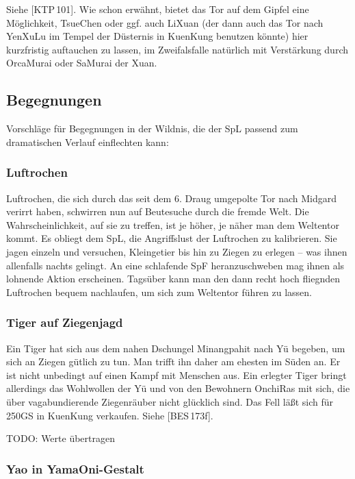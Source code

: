 \documentclass[
a4paper,
twoside,
DIV=calc,
BCOR=4mm,
fontsize=9pt,
twocolumn=on,
titlepage=on,
parskip=half
]{scrartcl}
\begin{document}
Siehe [KTP\,101]. Wie schon erwähnt, bietet das Tor auf dem Gipfel
eine Möglichkeit, TsueChen oder ggf. auch LiXuan (der dann auch das
Tor nach YenXuLu im Tempel der Düsternis in KuenKung benutzen könnte)
hier kurzfristig auftauchen zu lassen, im Zweifalsfalle natürlich mit
Verstärkung durch OrcaMurai oder SaMurai der Xuan.

\subsection{Begegnungen}

Vorschläge für Begegnungen in der Wildnis, die der SpL passend zum
dramatischen Verlauf einflechten kann:

\subsubsection{Luftrochen}
\label{begegnung-luftrochen}

Luftrochen, die sich durch das seit dem 6. Draug umgepolte Tor nach
Midgard verirrt haben, schwirren nun auf Beutesuche durch die fremde
Welt. Die Wahrscheinlichkeit, auf sie zu treffen, ist je höher, je
näher man dem Weltentor kommt. Es obliegt dem SpL, die Angriffslust
der Luftrochen zu kalibrieren. Sie jagen einzeln und versuchen,
Kleingetier bis hin zu Ziegen zu erlegen -- was ihnen allenfalls
nachts gelingt. An eine schlafende SpF heranzuschweben mag ihnen
als lohnende Aktion erscheinen. Tagsüber kann man den dann recht hoch
fliegnden Luftrochen bequem nachlaufen, um sich zum Weltentor führen
zu lassen.

\subsubsection{Tiger auf Ziegenjagd}

Ein Tiger hat sich aus dem nahen Dschungel Minangpahit nach Yü
begeben, um sich an Ziegen gütlich zu tun. Man trifft ihn daher am
ehesten im Süden an. Er ist nicht unbedingt auf einen Kampf mit
Menschen aus. Ein erlegter Tiger bringt allerdings das Wohlwollen der
Yü und von den Bewohnern OnchiRas mit sich, die über vagabundierende
Ziegenräuber nicht glücklich sind. Das Fell läßt sich für 250GS in
KuenKung verkaufen. Siehe [BES\,173f].

TODO: Werte übertragen

\subsubsection{Yao in YamaOni-Gestalt}
\end{document}
